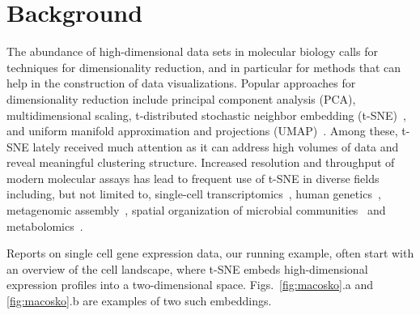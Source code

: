 \documentclass[twocolumn]{bmcart}
\begin{document}


\section*{Background}

The abundance of high-dimensional data sets in molecular biology calls for
techniques for dimensionality reduction, and in particular for methods that can
help in the construction of data visualizations. Popular approaches for
dimensionality reduction include principal component analysis (PCA),
multidimensional scaling, t-distributed stochastic neighbor embedding
(t-SNE)~\cite{maaten2008visualizing}, and uniform manifold approximation and
projections (UMAP)~\cite{2018arXivUMAP}. 
Among these, t-SNE lately received much attention as it can address high
volumes of data and reveal meaningful clustering structure. Increased
resolution and throughput of modern molecular assays has lead to frequent use
of t-SNE in diverse fields including, but not limited to, single-cell
transcriptomics~\cite{macosko2015highly,cao2019single,tasic2018shared}, human
genetics~\cite{hirata2019genetic}, metagenomic
assembly~\cite{beaulaurier2018metagenomic}, spatial organization of microbial
communities~\cite{sheth2019spatial} and
metabolomics~\cite{tkachev2019differences}.

Reports on single cell gene expression data, our running example,
often start with an overview of the cell landscape, where t-SNE embeds
high-dimensional expression profiles into a two-dimensional
space. Figs.~\ref{fig:macosko}.a and \ref{fig:macosko}.b are examples of two such
embeddings.
\end{document}
